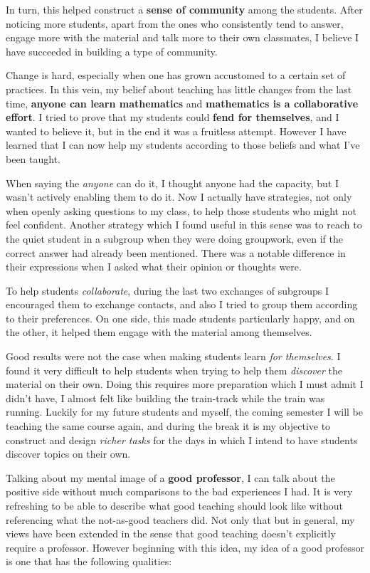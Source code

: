 \documentclass[a4paper,12pt,final]{book}
\begin{document}
In turn, this helped construct a \textbf{sense of community} among the students. After noticing more students, apart from the ones who consistently tend to answer, engage more with the material and talk more to their own classmates, I believe I have succeeded in building a type of community.\par 
Change is hard, especially when one has grown accustomed to a certain set of practices. In this vein, my belief about teaching has little changes from the last time, \textbf{anyone can learn mathematics} and \textbf{mathematics is a collaborative effort}. I tried to prove that my students could \textbf{fend for themselves}, and I wanted to believe it, but in the end it was a fruitless attempt. However I have learned that I can now help my students according to those beliefs and what I've been taught.\par
When saying the \emph{anyone} can do it, I thought anyone had the capacity, but I wasn't actively enabling them to do it. 
Now I actually have strategies, not only when openly asking questions to my class, to help those students who might not feel confident.
Another strategy which I found useful in this sense was to reach to the quiet student in a subgroup when they were doing groupwork, even if the correct answer had already been mentioned. There was a notable difference in their expressions when I asked what their opinion or thoughts were.\par 
To help students \emph{collaborate}, during the last two exchanges of subgroups I encouraged them to exchange contacts, and also I tried to group them according to their preferences. On one side, this made students particularly happy, and on the other, it helped them engage with the material among themselves.\par 
Good results were not the case when making students learn \emph{for themselves}. I found it very difficult to help students when trying to help them \emph{discover} the material on their own. Doing this requires more preparation which I must admit I didn't have, I almost felt like building the train-track while the train was running. Luckily for my future students and myself, the coming semester I will be teaching the same course again, and during the break it is my objective to construct and design \emph{richer tasks} for the days in which I intend to have students discover topics on their own.\par 
Talking about my mental image of a \textbf{good professor}, I can talk about the positive side without much comparisons to the bad experiences I had. It is very refreshing to be able to describe what good teaching should look like without referencing what the not-as-good teachers did. Not only that but in general, my views have been extended in the sense that good teaching doesn't explicitly require a professor. However beginning with this idea, my idea of a good professor is one that has the following qualities:
\end{document}
